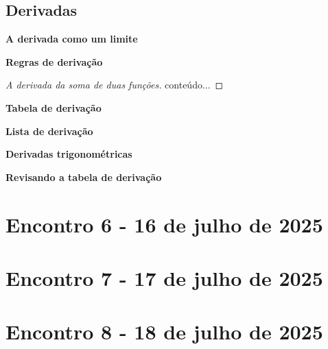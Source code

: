 \documentclass[12pt,openright,twoside,a4paper]{article}
\theoremstyle{definition}
\begin{document}
	\subsection{Derivadas}
	
	\textbf{A derivada como um limite}
	
	\textbf{Regras de derivação}
	
	\begin{proof}[A derivada da soma de duas funções]
		conteúdo...
	\end{proof}
	
	\textbf{Tabela de derivação}
	
	\textbf{Lista de derivação}
	
	\textbf{Derivadas trigonométricas}
	
	\textbf{Revisando a tabela de derivação}
	
	\pagebreak
	\section{Encontro 6 - 16 de julho de 2025}
	
	\pagebreak
	\section{Encontro 7 - 17 de julho de 2025}
	
	\pagebreak
	\section{Encontro 8 - 18 de julho de 2025}
	
	\newpage
	\printbibliography
\end{document}
